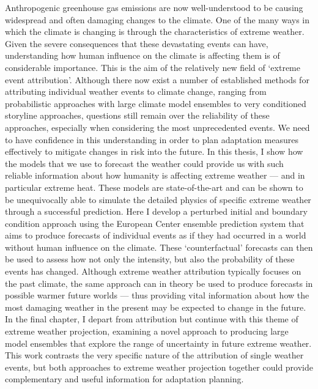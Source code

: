 Anthropogenic greenhouse gas emissions are now well-understood to be causing widespread and often damaging changes to the climate. One of the many ways in which the climate is changing is through the characteristics of extreme weather. Given the severe consequences that these devastating events can have, understanding how human influence on the climate is affecting them is of considerable importance. This is the aim of the relatively new field of `extreme event attribution'. Although there now exist a number of established methods for attributing individual weather events to climate change, ranging from probabilistic approaches with large climate model ensembles to very conditioned storyline approaches, questions still remain over the reliability of these approaches, especially when considering the most unprecedented events. We need to have confidence in this understanding in order to plan adaptation measures effectively to mitigate changes in risk into the future. In this thesis, I show how the models that we use to forecast the weather could provide us with such reliable information about how humanity is affecting extreme weather --- and in particular extreme heat. These models are state-of-the-art and can be shown to be unequivocally able to simulate the detailed physics of specific extreme weather through a successful prediction. Here I develop a perturbed initial and boundary condition approach using the European Center ensemble prediction system that aims to produce forecasts of individual events as if they had occurred in a world without human influence on the climate. These `counterfactual' forecasts can then be used to assess how not only the intensity, but also the probability of these events has changed. Although extreme weather attribution typically focuses on the past climate, the same approach can in theory be used to produce forecasts in possible warmer future worlds --- thus providing vital information about how the most damaging weather in the present may be expected to change in the future. In the final chapter, I depart from attribution but continue with this theme of extreme weather projection, examining a novel approach to producing large model ensembles that explore the range of uncertainty in future extreme weather. This work contrasts the very specific nature of the attribution of single weather events, but both approaches to extreme weather projection together could provide complementary and useful information for adaptation planning. 